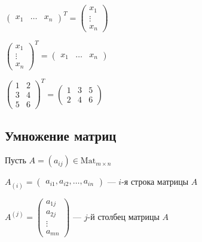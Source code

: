 \begin{example}
    \( \begin{pmatrix}
        x_1 & \dots & x_n
    \end{pmatrix}^T = \begin{pmatrix}
        x_1 \\ \vdots \\ x_n
    \end{pmatrix} \)
\end{example}
\begin{example}
    \( \begin{pmatrix}
    x_1 \\ \vdots \\ x_n
    \end{pmatrix}^T = \begin{pmatrix}
    x_1 & \dots & x_n
    \end{pmatrix} \)
\end{example}
\begin{example}
    \( \begin{pmatrix}
        1 & 2 \\ 3 & 4 \\ 5 & 6
    \end{pmatrix}^T = \begin{pmatrix}
        1 & 3 & 5 \\
        2 & 4 & 6
    \end{pmatrix} \)
\end{example}

\subsection{Умножение матриц}

Пусть $A = (a_{ij}) \in \text{Mat}_{m \times n}$

\bigskip

$A_{(i)} = \begin{pmatrix} a_{i1}, a_{i2}, \dots, a_{in} \end{pmatrix} $ --- $i$-я строка матрицы $A$

$A^{(j)} = \begin{pmatrix} a_{1j} \\ a_{2j} \\ \vdots \\ a_{mn} \end{pmatrix} $ --- $j$-й  столбец матрицы $A$

